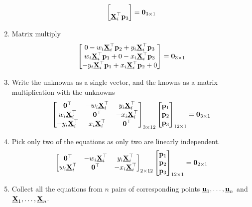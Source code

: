 \documentclass{article}
\begin{document}
\begin{enumerate}
\[\begin{bmatrix}
          \\
          \underline{\mathbf{X}}_i^\top\mathbf{p}_3
        \end{bmatrix} = \mathbf{0}_{3 \times 1}
        \]
      \item Matrix multiply
        \[
          \begin{bmatrix}
            0 -w_i \underline{\mathbf{X}}_i^\top\mathbf{p}_2 + y_i \underline{\mathbf{X}}_i^\top\mathbf{p}_3 \\
            w_i \underline{\mathbf{X}}_i^\top\mathbf{p}_1 + 0  -x_i \underline{\mathbf{X}}_i^\top\mathbf{p}_3 \\
            -y_i \underline{\mathbf{X}}_i^\top\mathbf{p}_1 + x_i \underline{\mathbf{X}}_i^\top\mathbf{p}_2 + 0
          \end{bmatrix} = \mathbf{0}_{3 \times 1}
          \]
        \item Write the unknowns as a single vector, and the knowns as a matrix
          multiplication with the unknowns
          \[
            \begin{bmatrix}
              \mathbf{0}^\top & -w_i \underline{\mathbf{X}}_i^\top & y_i \underline{\mathbf{X}}_i^\top \\
              w_i \underline{\mathbf{X}}_i^\top & \mathbf{0}^\top  & -x_i \underline{\mathbf{X}}_i^\top \\
              -y_i \underline{\mathbf{X}}_i^\top & x_i \underline{\mathbf{X}}_i^\top & \mathbf{0}^\top
              \end{bmatrix}_{3 \times 12}
              \begin{bmatrix}
                \mathbf{p}_1 \\
                \mathbf{p}_2 \\
                \mathbf{p}_3
                \end{bmatrix}_{12 \times 1}
                = \mathbf{0}_{3 \times 1}
            \]
     \item Pick only two of the equations as only two are linearly independent.
       \[
         \begin{bmatrix}
           \mathbf{0}^\top & -w_i \underline{\mathbf{X}}_i^\top & y_i \underline{\mathbf{X}}_i^\top \\
           w_i \underline{\mathbf{X}}_i^\top & \mathbf{0}^\top  & -x_i \underline{\mathbf{X}}_i^\top
         \end{bmatrix}_{2 \times 12}
         \begin{bmatrix}
           \mathbf{p}_1 \\
           \mathbf{p}_2 \\
           \mathbf{p}_3
         \end{bmatrix}_{12 \times 1}
         = \mathbf{0}_{2 \times 1}
       \]
     \item Collect all the equations from $n$ pairs of corresponding points
       $\underline{\mathbf{u}}_1, \dots, \underline{\mathbf{u}}_n$ and $\underline{\mathbf{X}}_1, \dots, \underline{\mathbf{X}}_n$.

\end{enumerate}
\end{document}
